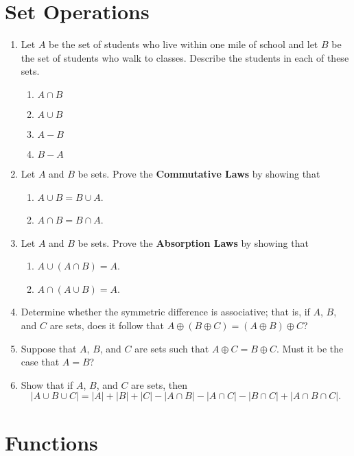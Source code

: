 \documentclass{sig-alternate-05-2015}
\begin{document}
\section{Set Operations}
\begin{enumerate}
\item Let $A$ be the set of students who live within one mile
of school and let $B$ be the set of students who walk to
classes. Describe the students in each of these sets.
\begin{enumerate}
	\item $A \cap B$
	\item $A \cup B$
	\item $A - B$
	\item $B - A$
\end{enumerate}

\item Let $A$ and $B$ be sets. Prove the \textbf{Commutative Laws} by showing that
\begin{enumerate}
	\item $A \cup B = B \cup A$.
	\item $A \cap B = B \cap A$.
\end{enumerate}

\item Let $A$ and $B$ be sets. Prove the \textbf{Absorption Laws} by showing that
\begin{enumerate}
	\item $A \cup (A \cap B) = A$.
	\item $A \cap (A \cup B) = A$.
\end{enumerate}

\item Determine whether the symmetric difference is associative;
that is, if $A$, $B$, and $C$ are sets, does it follow that
$A \oplus (B \oplus C) = (A \oplus B) \oplus C$?
\item Suppose that $A$, $B$, and $C$ are sets such that $A \oplus C =
B \oplus C$. Must it be the case that $A = B$?

\item Show that if $A$, $B$, and $C$ are sets, then
\begin{equation}
	|A \cup B \cup C| = |A| + |B| + |C| - |A \cap B| - |A \cap C| - |B \cap C| + |A \cap B \cap C|.
\end{equation}

\end{enumerate}
\section{Functions}
\end{document}

